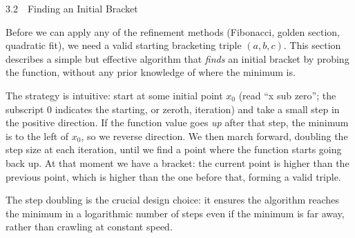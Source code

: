 \documentclass[aspectratio=169,10pt]{beamer}
\begin{document}
\begin{frame}[allowframebreaks]{3.2\ \ Finding an Initial Bracket}

  Before we can apply any of the refinement methods (Fibonacci, golden section,
  quadratic fit), we need a valid starting bracketing triple $(a, b, c)$.
  This section describes a simple but effective algorithm that \emph{finds}
  an initial bracket by probing the function, without any prior knowledge
  of where the minimum is.

  The strategy is intuitive: start at some initial point $x_0$ (read ``x sub
  zero''; the subscript 0 indicates the starting, or zeroth, iteration) and
  take a small step in the positive direction.  If the function value goes
  \emph{up} after that step, the minimum is to the left of $x_0$, so we
  reverse direction.  We then march forward, doubling the step size at each
  iteration, until we find a point where the function starts going back up.
  At that moment we have a bracket: the current point is higher than the
  previous point, which is higher than the one before that, forming a valid
  triple.

  The step doubling is the crucial design choice: it ensures the algorithm
  reaches the minimum in a logarithmic number of steps even if the minimum is
  far away, rather than crawling at constant speed.


\end{frame}
\end{document}
